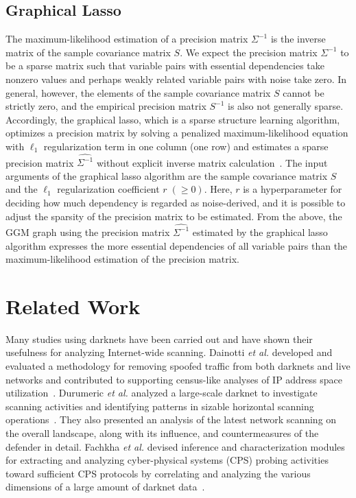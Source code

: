 \documentclass[conference]{IEEEtran}
\begin{document}
\subsection{Graphical Lasso}
The maximum-likelihood estimation of a precision matrix $\Sigma^{-1}$ is the inverse matrix of the sample covariance matrix $S$.
We expect the precision matrix $\Sigma^{-1}$ to be a sparse matrix such that variable pairs with essential dependencies take nonzero values and perhaps weakly related variable pairs with noise take zero.
In general, however, the elements of the sample covariance matrix $S$ cannot be strictly zero, and the empirical precision matrix $S^{-1}$ is also not generally sparse.
Accordingly, the graphical lasso, which is a sparse structure learning algorithm, optimizes a precision matrix by solving a penalized maximum-likelihood equation with $\ell_1$ regularization term in one column (one row) and estimates a sparse precision matrix $\hat{\Sigma^{-1}}$ without explicit inverse matrix calculation~\cite{Friedman}.
The input arguments of the graphical lasso algorithm are the sample covariance matrix $S$ and the $\ell_1$ regularization coefficient $r\;(\geq 0)$.
Here, $r$ is a hyperparameter for deciding how much dependency is regarded as noise-derived, and it is possible to adjust the sparsity of the precision matrix to be estimated.
From the above, the GGM graph using the precision matrix $\hat{\Sigma^{-1}}$ estimated by the graphical lasso algorithm expresses the more essential dependencies of all variable pairs than the maximum-likelihood estimation of the precision matrix.



\section{Related Work}
Many studies using darknets have been carried out and have shown their usefulness for analyzing Internet-wide scanning.
Dainotti \textit{et al.} developed and evaluated a methodology for removing spoofed traffic from both darknets and live networks and contributed to supporting census-like analyses of IP address space utilization~\cite{Dainotti}.
Durumeric \textit{et al.} analyzed a large-scale darknet to investigate scanning activities and identifying patterns in sizable horizontal scanning operations~\cite{Durumeric}.
They also presented an analysis of the latest network scanning on the overall landscape, along with its influence, and countermeasures of the defender in detail.
Fachkha \textit{et al.} devised inference and characterization modules for extracting and analyzing cyber-physical systems (CPS) probing activities toward sufficient CPS protocols by correlating and analyzing the various dimensions of a large amount of darknet data~\cite{Fachkha}.
\end{document}

